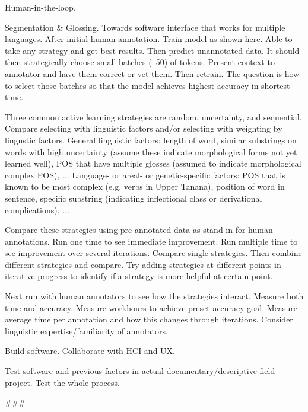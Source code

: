 
Human-in-the-loop. 

Segmentation \& Glossing. Towards software interface that works for multiple languages. After initial human annotation. Train model as shown here. Able to take any strategy and get best results. Then predict unannotated data. It should then strategically choose small batches (~50) of tokens. Present context to annotator and have them correct or vet them. Then retrain. The question is how to select those batches so that the model achieves highest accuracy in shortest time. 

Three common active learning strategies are random, uncertainty, and sequential. Compare selecting with linguistic factors and/or selecting with weighting by lingustic factors. General linguistic factors: length of word, similar substrings on words with high uncertainty (assume these indicate morphological forms not yet learned well), POS that have multiple glosses (assumed to indicate morphological complex POS), ...
Language- or areal- or genetic-specific factors: POS that is known to be most complex (e.g. verbs in Upper Tanana), position of word in sentence, specific substring (indicating inflectional class or derivational complications), ...

Compare these strategies using pre-annotated data as stand-in for human annotations. Run one time to see immediate improvement. Run multiple time to see improvement over several iterations. Compare single strategies. Then combine different strategies and compare. Try adding strategies at different points in iterative progress to identify if a strategy is more helpful at certain point. 

Next run with human annotators to see how the strategies interact. Measure both time and accuracy. Measure workhours to achieve preset accuracy goal. Measure average time per annotation and how this changes through iterations. Consider linguistic expertise/familiarity of annotators. 

Build software. Collaborate with HCI and UX. 

Test software and previous factors in actual documentary/descriptive field project. Test the whole process.

\#\#\#

